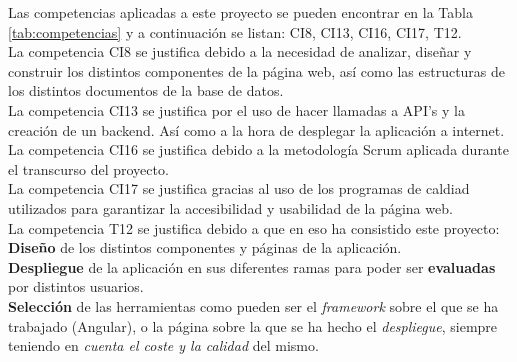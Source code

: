 Las competencias aplicadas a este proyecto se pueden encontrar en la Tabla 
\ref{tab:competencias} y a continuación se listan: CI8, CI13, CI16, CI17, T12.\\
\-\hspace{1cm} La competencia CI8 se justifica debido a la necesidad de analizar,
diseñar y construir los distintos componentes de la página web, así como las 
estructuras de los distintos documentos de la base de datos.\\
\-\hspace{1cm} La competencia CI13 se justifica por el uso de hacer llamadas a API's
y la creación de un backend. Así como a la hora de desplegar la aplicación a internet. \\
\-\hspace{1cm} La competencia CI16 se justifica debido a la metodología Scrum aplicada
durante el transcurso del proyecto. \\
\-\hspace{1cm} La competencia CI17 se justifica gracias al uso de los programas de 
caldiad utilizados para garantizar la accesibilidad y usabilidad de la página web.\\
\-\hspace{1cm} La competencia T12 se justifica debido a que en eso ha consistido este proyecto: \\
\-\hspace{1.5cm} \textbf{Diseño} de los distintos componentes y páginas de la aplicación.\\
\-\hspace{1.5cm} \textbf{Despliegue} de la aplicación en sus diferentes ramas para poder ser \textbf{evaluadas} 
    por distintos usuarios.\\
\-\hspace{1.5cm} \textbf{Selección} de las herramientas como pueden ser el \textit{framework} sobre el que se ha 
trabajado (Angular), o la página sobre la que se ha hecho el \textit{despliegue}, siempre teniendo en \textit{cuenta el coste 
y la calidad} del mismo.\\

